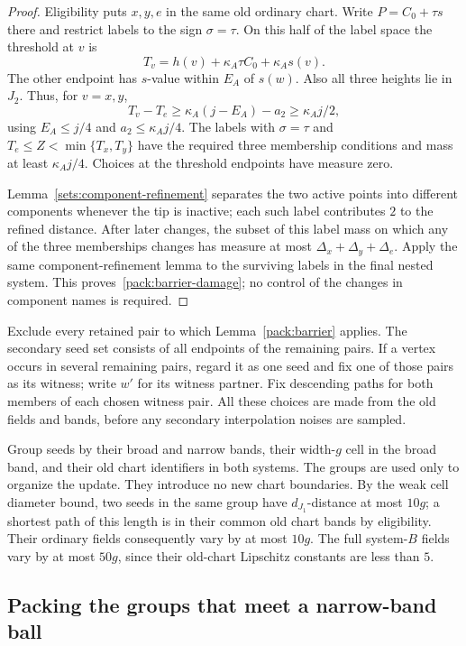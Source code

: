 \begin{proof}
Eligibility puts $x,y,e$ in the same old ordinary chart.  Write
$P=C_0+\tau s$ there and restrict labels to the sign $\sigma=\tau$.
On this half of the label space the threshold at $v$ is
\[
 T_v=h(v)+\kappa_A\tau C_0+\kappa_As(v).
\]
The other endpoint has $s$-value within $E_A$ of $s(w)$.
Also all three heights lie in $J_2$.  Thus, for $v=x,y$,
\[
 T_v-T_e\ge\kappa_A(j-E_A)-a_2\ge\kappa_Aj/2,
\]
using $E_A\le j/4$ and $a_2\le\kappa_Aj/4$.
The labels with $\sigma=\tau$ and
$T_e\le Z<\min\{T_x,T_y\}$ have the required three membership
conditions and mass at least $\kappa_Aj/4$.  Choices at the
threshold endpoints have measure zero.

Lemma~\ref{sets:component-refinement} separates the two active
points into different components whenever the tip is inactive;
each such label contributes $2$ to the refined distance.
After later changes, the subset of this label mass on which any
of the three memberships changes has measure at most
$\Delta_x+\Delta_y+\Delta_e$.  Apply the same component-refinement
lemma to the surviving labels in the final nested system.  This
proves~\eqref{pack:barrier-damage}; no control of the changes in
component names is required.
\end{proof}

Exclude every retained pair to which Lemma~\ref{pack:barrier}
applies.  The secondary seed set consists of all endpoints of the
remaining pairs.  If a vertex occurs in several remaining pairs,
regard it as one seed and fix one of those pairs as its witness;
write $w'$ for its witness partner.  Fix descending paths for both
members of each chosen witness pair.  All these choices are made
from the old fields and bands, before any secondary interpolation
noises are sampled.

Group seeds by their broad and narrow bands, their width-$g$ cell
in the broad band, and their old chart identifiers in both systems.
The groups are used only to organize the update.  They introduce
no new chart boundaries.  By the weak cell diameter bound, two
seeds in the same group have $d_{J_1}$-distance at most $10g$;
a shortest path of this length is in their common old chart bands
by eligibility.  Their ordinary fields consequently vary by at most $10g$. The full
system-$B$ fields vary by at most $50g$, since their old-chart Lipschitz
constants are less than $5$.

\subsection{Packing the groups that meet a narrow-band ball}
\label{pack:section}

